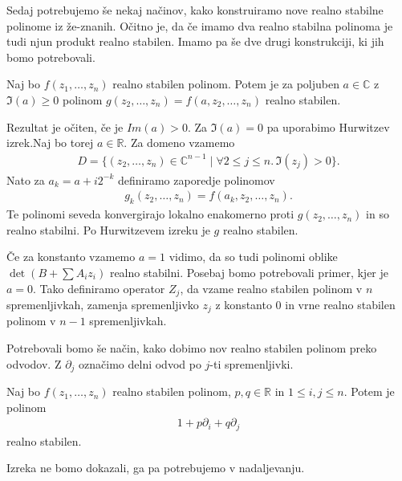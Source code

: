 Sedaj potrebujemo še nekaj načinov, kako konstruiramo nove realno stabilne polinome iz že-znanih. Očitno je, da če imamo dva realno stabilna polinoma je tudi njun produkt realno stabilen. Imamo pa še dve drugi konstrukciji, ki jih bomo potrebovali\cite{wagner-multivariate}.
\begin{izrek}
    Naj bo \(f(z_1, \ldots, z_n)\) realno stabilen polinom. Potem je za poljuben \(a\in \mathbb C\) z \(\Im(a)\geq 0\) polinom \(g(z_2, \ldots, z_n) = f(a, z_2, \ldots, z_n)\) realno stabilen.
\end{izrek}
\begin{dokaz}
    Rezultat je očiten, če je \(Im(a) > 0\). Za \(\Im(a) = 0\) pa uporabimo Hurwitzev izrek.Naj bo torej \(a\in \mathbb R\). Za domeno vzamemo
    \begin{align*}
        D=\{(z_2,\ldots,z_n) \in \mathbb C^{n-1}\mid \forall 2\leq j \leq n.\, \Im(z_j)> 0\}.
    \end{align*}
    Nato za \(a_k = a + i 2^{-k}\) definiramo zaporedje polinomov
    \begin{align*}
        g_k(z_2, \ldots, z_n) = f(a_k, z_2, \ldots, z_n).
    \end{align*}
    Te polinomi seveda konvergirajo lokalno enakomerno proti \(g(z_2, \ldots, z_n)\) in so realno stabilni. Po Hurwitzevem izreku je \(g\) realno stabilen.
\end{dokaz}
Če za konstanto vzamemo \(a=1\) vidimo, da so tudi polinomi oblike \(\det(B + \sum A_i z_i)\) realno stabilni.
Posebaj bomo potrebovali primer, kjer je \(a = 0\). Tako definiramo operator \(Z_j\), da vzame realno stabilen polinom v \(n\) spremenljivkah, zamenja spremenljivko \(z_j\) z konstanto \(0\) in vrne realno stabilen polinom v \(n-1\) spremenljivkah.

Potrebovali bomo še način, kako dobimo nov realno stabilen polinom preko odvodov. Z \(\partial_j\) označimo delni odvod po \(j\)-ti spremenljivki\cite{Borcea_2010}.
\begin{izrek}
    Naj bo \(f(z_1, \ldots, z_n)\) realno stabilen polinom, \(p, q\in \mathbb R\) in \(1\leq i, j \leq n\). Potem je polinom
    \begin{align*}
        1+p\partial_i + q\partial_j
    \end{align*}
    realno stabilen.
\end{izrek}
Izreka ne bomo dokazali, ga pa potrebujemo v nadaljevanju.

